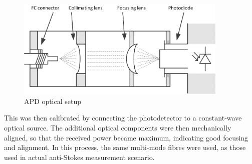 \documentclass{standalone}
\begin{document}
\begin{figure}[h]
	\centering
	\includegraphics[width=0.9\textwidth]{apd_optics.png}
	\caption{APD optical setup}
	\label{fig:apd_optics}
\end{figure}
This was then calibrated by connecting the photodetector to a constant-wave optical source. The additional optical components were then mechanically aligned, so that the received power became maximum, indicating good focusing and alignment. In this process, the same multi-mode fibres were used, as those used in actual anti-Stokes measurement scenario. \\
\end{document}
